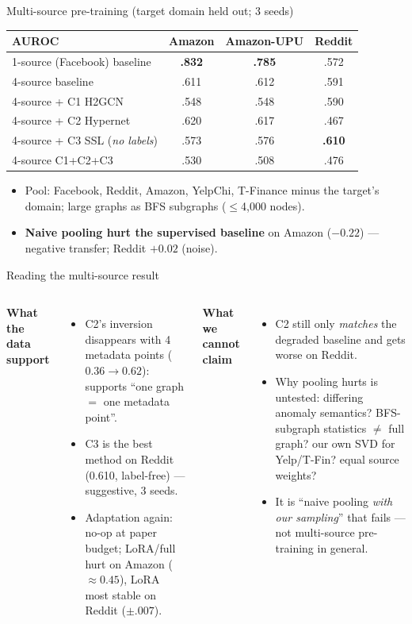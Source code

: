 \documentclass[aspectratio=169,11pt]{beamer}
\begin{document}
\begin{frame}{Multi-source pre-training (target domain held out; 3 seeds)}
\centering\small
\begin{tabular}{lccc}
\toprule
AUROC & Amazon & Amazon-UPU & Reddit\\ \midrule
1-source (Facebook) baseline & \textbf{.832} & \textbf{.785} & .572\\
4-source baseline & \textcolor{bad}{.611} & \textcolor{bad}{.612} & .591\\
4-source + C1 H2GCN & .548 & .548 & .590\\
4-source + C2 Hypernet & .620 & .617 & \textcolor{bad}{.467}\\
4-source + C3 SSL (\emph{no labels}) & .573 & .576 & \textcolor{good}{\textbf{.610}}\\
4-source C1+C2+C3 & .530 & .508 & .476\\ \bottomrule
\end{tabular}
\vspace{4pt}
\begin{itemize}\footnotesize
\item Pool: Facebook, Reddit, Amazon, YelpChi, T-Finance minus the target's domain; large graphs as BFS subgraphs ($\le$4,000 nodes).
\item \textbf{Naive pooling hurt the supervised baseline} on Amazon ($-0.22$) --- negative transfer; Reddit $+0.02$ (noise).
\end{itemize}
\end{frame}

\begin{frame}{Reading the multi-source result}
\begin{columns}[T]
\textbf{What the data support}
\begin{itemize}\small
\item \textcolor{good}{C2's inversion disappears} with 4 metadata points ($0.36\to0.62$): supports ``one graph $=$ one metadata point''.
\item \textcolor{good}{C3} is the best method on Reddit (0.610, label-free) --- suggestive, 3 seeds.
\item Adaptation again: no-op at paper budget; LoRA/full hurt on Amazon ($\approx0.45$), LoRA most stable on Reddit ($\pm.007$).
\end{itemize}
\textbf{What we cannot claim}
\begin{itemize}\small
\item C2 still only \emph{matches} the degraded baseline and gets worse on Reddit.
\item Why pooling hurts is \alert{untested}: differing anomaly semantics? BFS-subgraph statistics $\ne$ full graph? our own SVD for Yelp/T-Fin? equal source weights?
\item It is ``naive pooling \emph{with our sampling}'' that fails --- not multi-source pre-training in general.
\end{itemize}
\end{columns}
\end{frame}
\end{document}
